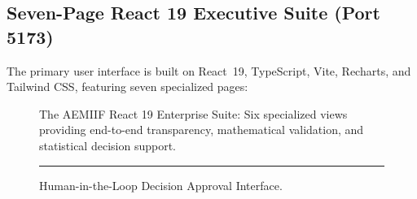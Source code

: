 \documentclass[conference]{IEEEtran}
\begin{document}
\subsection{Seven-Page React 19 Executive Suite (Port 5173)}
The primary user interface is built on React~19, TypeScript, Vite, Recharts, and Tailwind CSS, featuring seven specialized pages:

\begin{figure}[t]
\centering
{}\hfill
{}\hfill
{}

\vspace{1em}

\hfill
{}\hfill
{}
\caption{The AEMIIF React 19 Enterprise Suite: Six specialized views providing end-to-end transparency, mathematical validation, and statistical decision support.}
\label{fig:react_suite}
\end{figure}

\begin{figure}[htbp]
\centering
\rule{\linewidth}{3.2cm}
\caption{Human-in-the-Loop Decision Approval Interface.}
\label{fig:decision_approval}
\end{figure}
\end{document}
